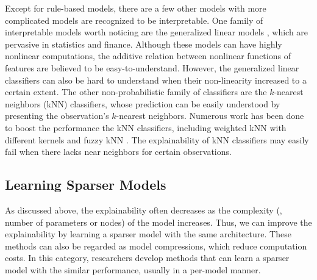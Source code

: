 Except for rule-based models, there are a few other models with more complicated models are recognized to be interpretable.
One family of interpretable models worth noticing are the generalized linear models \cite{debock2010gam}, which are pervasive in statistics and finance. Although these models can have highly nonlinear computations, the additive relation between nonlinear functions of features are believed to be easy-to-understand. However, the generalized linear classifiers can also be hard to understand when their non-linearity increased to a certain extent. The other non-probabilistic family of classifiers are the $k$-nearest neighbors (kNN) classifiers, whose prediction can be easily understood by presenting the observation's $k$-nearest neighbors. Numerous work has been done to boost the performance the kNN classifiers, including weighted kNN with different kernels \cite{dudani1976weightedknn} and fuzzy kNN \cite{keller1985fuzzyknn}. The explainability of kNN classifiers may easily fail when there lacks near neighbors for certain observations.







\subsection{Learning Sparser Models}

As discussed above, the explainability often decreases as the complexity (\ie, number of parameters or nodes) of the model increases. Thus, we can improve the explainability by learning a sparser model with the same architecture. These methods can also be regarded as model compressions, which reduce computation costs. In this category, researchers develop methods that can learn a sparser model with the similar performance, usually in a per-model manner. 


